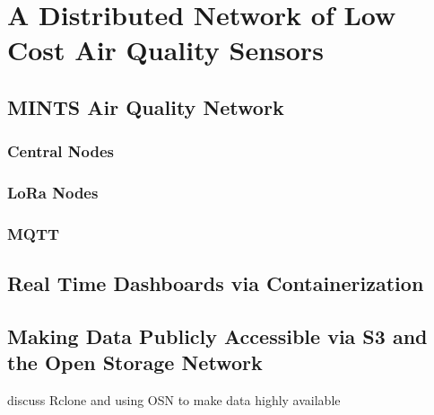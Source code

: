 \chapter{A Distributed Network of Low Cost Air Quality Sensors}

\section{MINTS Air Quality Network}
\subsection{Central Nodes}
\subsection{LoRa Nodes}
\subsection{MQTT}

\section{Real Time Dashboards via Containerization}

\section{Making Data Publicly Accessible via S3 and the Open Storage Network}
discuss Rclone and using OSN to make data highly available
